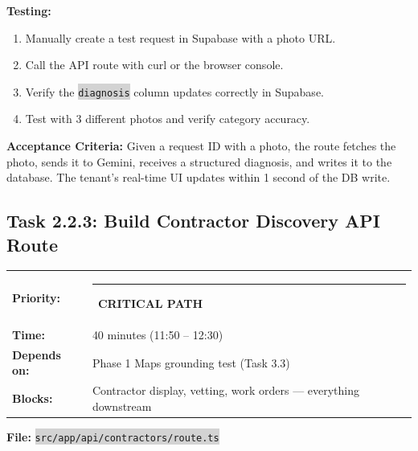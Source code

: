 \documentclass[11pt, a4paper]{article}
\newcommand{\critical}{\textcolor{critred}{\rule{6pt}{6pt}}~\textcolor{critred}{\scriptsize\textbf{CRITICAL PATH}}}
\newcommand{\code}[1]{\texttt{\small\colorbox{lightgray}{#1}}}
\begin{document}
\textbf{Testing:}
\begin{enumerate}[leftmargin=2em, itemsep=2pt]
  \item Manually create a test request in Supabase with a photo URL.
  \item Call the API route with curl or the browser console.
  \item Verify the \code{diagnosis} column updates correctly in Supabase.
  \item Test with 3 different photos and verify category accuracy.
\end{enumerate}

\textbf{Acceptance Criteria:} Given a request ID with a photo, the route fetches the photo, sends it to Gemini, receives a structured diagnosis, and writes it to the database. The tenant's real-time UI updates within 1 second of the DB write.

\vspace{1em}

\subsection{Task 2.2.3: Build Contractor Discovery API Route}

\begin{tabularx}{\textwidth}{lX}
\textbf{Priority:} & \critical \\
\textbf{Time:} & 40 minutes (11:50 -- 12:30) \\
\textbf{Depends on:} & Phase 1 Maps grounding test (Task 3.3) \\
\textbf{Blocks:} & Contractor display, vetting, work orders --- everything downstream \\
\end{tabularx}

\vspace{0.3em}

\textbf{File:} \code{src/app/api/contractors/route.ts}
\end{document}
